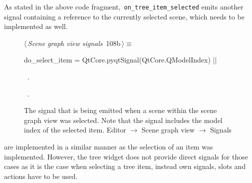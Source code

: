 \documentclass[%
    a4paper,    %
    justified,  %
    nobib,      %
    openany     %
]{tufte-book}
\makeatletter
\renewcommand{\label}[1]{\@tufte@label{##1}}%
\makeatother
\begin{document}
As stated in the above code fragment,~\verb=on_tree_item_selected= emits another
signal containing a reference to the currently selected scene, which needs to be
implemented as well.

\begin{figure}[!htbp]
\begin{flushleft} \small
\begin{minipage}{\linewidth}\label{scrap44}\raggedright\small
{} $\langle\,${\itshape Scene graph view signals}\nobreak\ {\footnotesize {108b}}$\,\rangle\equiv$
\vspace{-1ex}
\begin{pythoncode}
do_select_item = QtCore.pyqtSignal(QtCore.QModelIndex)
|\NWsep|
\end{pythoncode}
\vspace{1.5ex}
\footnotesize
\begin{list}{}{\setlength{\itemsep}{-\parsep}\setlength{\itemindent}{-\leftmargin}}
\item \NWtxtMacroDefBy\ .
\item \NWtxtMacroRefIn\ .

\item{}
\end{list}
\end{minipage}\vspace{4ex}
\end{flushleft}
\caption{The signal that is being emitted when a scene within the scene graph
view was selected. Note that the signal includes the model index of the selected
item.
  \newline{}\newline{}Editor $\rightarrow$ Scene graph view
  $\rightarrow$ Signals}
\end{figure}

 are implemented in a similar manner
as the selection of an item was implemented. However, the tree widget does not
provide direct signals for those cases as it is the case when selecting a tree
item, instead own signals, slots and actions have to be used.
\end{document}
